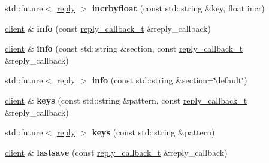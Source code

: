 \begin{DoxyCompactItemize}
\item 
\mbox{\label{classcpp__redis_1_1client_a32c78234437f7f02492e3e01dd44bc43}} 
std\+::future$<$ \hyperlink{classcpp__redis_1_1reply}{reply} $>$ {\bfseries incrbyfloat} (const std\+::string \&key, float incr)
\item 
\mbox{\label{classcpp__redis_1_1client_aaa98ba6f8936eaa013ca0df553199f85}} 
\hyperlink{classcpp__redis_1_1client}{client} \& {\bfseries info} (const \hyperlink{classcpp__redis_1_1client_a061a1140d36d2eaeda82b09a0bb3f9f2}{reply\+\_\+callback\+\_\+t} \&reply\+\_\+callback)
\item 
\mbox{\label{classcpp__redis_1_1client_af276159a3938c97e5318dff39a9084ae}} 
\hyperlink{classcpp__redis_1_1client}{client} \& {\bfseries info} (const std\+::string \&section, const \hyperlink{classcpp__redis_1_1client_a061a1140d36d2eaeda82b09a0bb3f9f2}{reply\+\_\+callback\+\_\+t} \&reply\+\_\+callback)
\item 
\mbox{\label{classcpp__redis_1_1client_aa0186723d51c8b3c92979537e8ad43b9}} 
std\+::future$<$ \hyperlink{classcpp__redis_1_1reply}{reply} $>$ {\bfseries info} (const std\+::string \&section=\char`\"{}default\char`\"{})
\item 
\mbox{\label{classcpp__redis_1_1client_acb7845a206b2321e6919c2f38282c322}} 
\hyperlink{classcpp__redis_1_1client}{client} \& {\bfseries keys} (const std\+::string \&pattern, const \hyperlink{classcpp__redis_1_1client_a061a1140d36d2eaeda82b09a0bb3f9f2}{reply\+\_\+callback\+\_\+t} \&reply\+\_\+callback)
\item 
\mbox{\label{classcpp__redis_1_1client_a1c0804cab9251acde742e725d0af6cbf}} 
std\+::future$<$ \hyperlink{classcpp__redis_1_1reply}{reply} $>$ {\bfseries keys} (const std\+::string \&pattern)
\item 
\mbox{\label{classcpp__redis_1_1client_a3b25eaf2691051156748abb69e1b0317}} 
\hyperlink{classcpp__redis_1_1client}{client} \& {\bfseries lastsave} (const \hyperlink{classcpp__redis_1_1client_a061a1140d36d2eaeda82b09a0bb3f9f2}{reply\+\_\+callback\+\_\+t} \&reply\+\_\+callback)

\end{DoxyCompactItemize}
